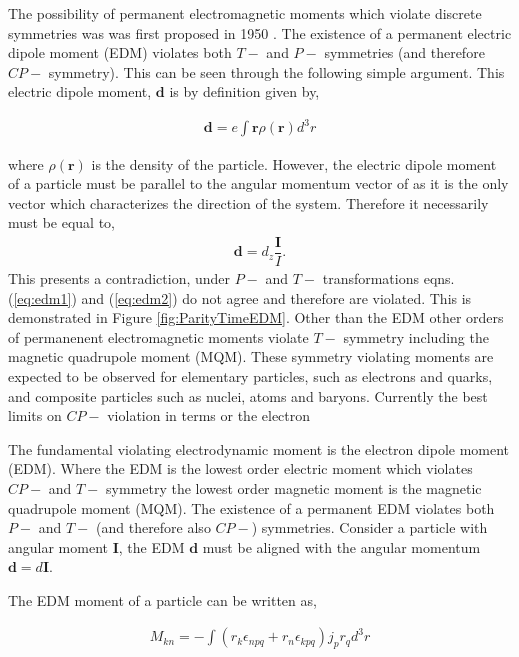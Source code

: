\documentclass[8pt,a4paper, twoside]{report}
\begin{document}
The possibility of permanent electromagnetic moments which violate  discrete symmetries was was first proposed in 1950 \cite{Purcell1950, Landau1957}. The existence of a permanent electric dipole moment (EDM) violates both $T-$ and $P-$ symmetries (and therefore $CP-$ symmetry). This can be seen through the following simple argument. This electric dipole moment, $\textbf{d}$ is by definition given by,  

\begin{align} \label{eq:edm1}
\textbf{d} = e\int \textbf{r}\rho(\textbf{r})d^3r
\end{align}

where $\rho(\textbf{r})$ is the density of the particle. However, the electric dipole moment of a particle must be parallel to the angular momentum vector of as it is the only vector which characterizes the direction of the system. Therefore it necessarily must be equal to, 
\begin{align} \label{eq:edm2}
\textbf{d}  = d_z \dfrac{\textbf{I}}{I}.
\end{align}
This presents a contradiction, under $P-$ and $T-$ transformations eqns. (\ref{eq:edm1}) and (\ref{eq:edm2}) do not agree and therefore are violated. This is demonstrated in Figure \ref{fig:ParityTimeEDM}. Other than the EDM other orders of permanenent electromagnetic moments violate $T-$ symmetry including the magnetic quadrupole moment (MQM). These symmetry violating moments are expected to be  observed for elementary particles, such as electrons and quarks, and composite particles such as nuclei, atoms and baryons. Currently the best limits on $CP-$ violation in terms or the electron 


 The fundamental violating electrodynamic moment is the electron dipole moment (EDM). Where the EDM is the lowest order electric moment which violates $CP-$ and $T-$ symmetry the lowest order magnetic moment is the magnetic quadrupole moment (MQM). The existence of a permanent EDM violates both $P-$ and $T-$ (and therefore also $CP-$) symmetries. Consider a particle with angular moment $\textbf{I}$, the EDM $\textbf{d}$ must be aligned with the angular momentum $\textbf{d} = d\textbf{I}$. 


The EDM moment of a particle can be written as,



\begin{align*}
M_{kn} = - \int \left( r_k \epsilon_{npq} + r_n\epsilon_{kpq} \right)j_pr_q d^3r
\end{align*}
\end{document}
